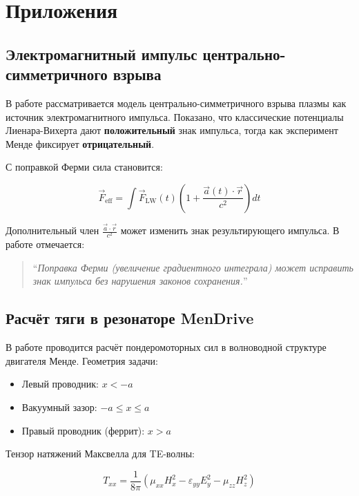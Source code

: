 \documentclass[12pt, a4paper]{article}
\begin{document}
\section{Приложения}

\subsection{Электромагнитный импульс центрально-симметричного взрыва}

В работе \cite{PlasmaExplosion} рассматривается модель центрально-симметричного взрыва плазмы как источник электромагнитного импульса. Показано, что классические потенциалы Лиенара-Вихерта дают \textbf{положительный} знак импульса, тогда как эксперимент Менде фиксирует \textbf{отрицательный}.

С поправкой Ферми сила становится:

\begin{equation}
\vec{F}_{\text{eff}} = \int \vec{F}_{\text{LW}}(t) \left( 1 + \frac{\vec{a}(t) \cdot \vec{r}}{c^2} \right) dt
\label{eq:fermi_force}
\end{equation}

Дополнительный член $\frac{\vec{a} \cdot \vec{r}}{c^2}$ может изменить знак результирующего импульса. В работе \cite{PlasmaExplosion} отмечается:

\begin{quote}
``\textit{Поправка Ферми (увеличение градиентного интеграла) может исправить знак импульса без нарушения законов сохранения.}''
\end{quote}

\subsection{Расчёт тяги в резонаторе MenDrive}

В работе \cite{MenDrive} проводится расчёт пондеромоторных сил в волноводной структуре двигателя Менде. Геометрия задачи:

\begin{itemize}
    \item Левый проводник: $x < -a$
    \item Вакуумный зазор: $-a \le x \le a$
    \item Правый проводник (феррит): $x > a$
\end{itemize}

Тензор натяжений Максвелла для TE-волны:

\begin{equation}
T_{xx} = \frac{1}{8\pi} \left( \mu_{xx} H_x^2 - \varepsilon_{yy} E_y^2 - \mu_{zz} H_z^2 \right)
\label{eq:stress_tensor}
\end{equation}
\end{document}
